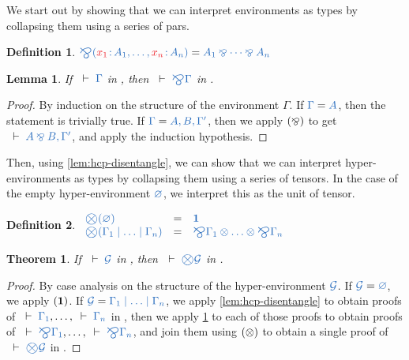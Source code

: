 \documentclass[draft,submission,copyright,creativecommons]{eptcs}
\newtheorem{definition}{Definition}
\newtheorem{lemma}{Lemma}
\newtheorem{theorem}{Theorem}
\begin{document}
We start out by showing that we can interpret environments as types by
collapsing them using a series of pars.
\begin{definition}\label{def:bigparr}
  \(
  \ty{\bigparr(\tmty{x_1}{A_1} , \dots , \tmty{x_n}{A_n})} =
  \ty{A_1 \parr \dots \parr A_n}
  \)
\end{definition}\noindent
\begin{lemma}\label{lem:cp-bigparr}
  If $\seq{\Gamma}$ in \cp, then $\seq{\bigparr\Gamma}$ in \cp.
\end{lemma}\vspace*{-0.75\baselineskip}%
\begin{proof}
  By induction on the structure of the environment $\Gamma$.
  If $\ty{\Gamma} = \ty{A}$, then the statement is trivially true.
  If $\ty{\Gamma} = \ty{A, B, \Gamma'}$, then we apply $(\mathbin{\bindnasrepma})$ to get $\seq{A
    \parr B, \Gamma'}$, and apply the induction hypothesis.
\end{proof}\noindent
Then, using \cref{lem:hcp-disentangle}, we can show that we can interpret
hyper-environments as types by collapsing them using a series of tensors.
In the case of the empty hyper-environment $\ty{\emptyhypercontext}$, we
interpret this as the unit of tensor.
\begin{definition}\label{def:bigtens}
  \(
  \begin{array}{lcl}
    \ty{\bigtens(\emptyhypercontext)}
    & = & \ty{\one}
    \\
    \ty{\bigtens(\Gamma_1 \hsep \dots \hsep \Gamma_n)}
    & = & \ty{\bigparr\Gamma_1 \tens \dots \tens \bigparr\Gamma_n}
  \end{array}
  \)
\end{definition}\noindent

\begin{theorem}\label{thm:hcp2cp-bigtens}
  If $\seq{\mathcal{G}}$ in \hcp, then $\seq{\bigtens\mathcal{G}}$ in \cp.
\end{theorem}\vspace*{-0.75\baselineskip}%
\begin{proof}
  By case analysis on the structure of the hyper-environment $\ty{\mathcal{G}}$.
  If $\ty{\mathcal{G}} = \ty{\emptyhypercontext}$, we apply $(\mathbf{1})$.
  If $\ty{\mathcal{G}} = \ty{\Gamma_1 \hsep \dots \hsep \Gamma_n}$, we apply
  \cref{lem:hcp-disentangle} to obtain proofs of $\seq{\Gamma_1}, \dots,
  \seq{\Gamma_n}$ in \cp, then we apply \cref{lem:cp-bigparr} to each of those
  proofs to obtain proofs of $\seq{\bigparr\Gamma_1}, \dots,
  \seq{\bigparr\Gamma_n}$, and join them using $(\otimes)$ to obtain a single
  proof of $\seq{\bigtens\mathcal{G}}$ in \cp.
\end{proof}\noindent
\end{document}
